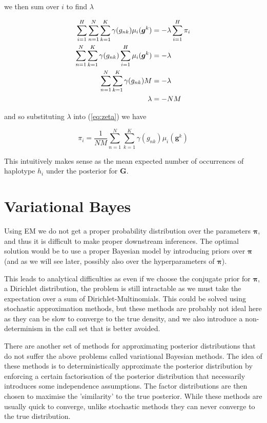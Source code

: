 \documentclass{article}
\begin{document}
we then sum over $i$ to find $\lambda$

\begin{align} 
    \sum_{i = 1}^H \sum_{n = 1}^N \sum_{k = 1}^K \gamma(g_{nk}) \mu_i(\boldsymbol{g}^k) &= -\lambda \sum_{i = 1}^H \pi_i \notag\\
      \sum_{n = 1}^N \sum_{k = 1}^K \gamma(g_{nk}) \sum_{i = 1}^H  \mu_i(\boldsymbol{g}^k) &= -\lambda \notag\\
      \sum_{n = 1}^N \sum_{k = 1}^K \gamma(g_{nk}) M &= -\lambda \notag\\
      \lambda &= -NM
\end{align}

and so substituting $\lambda$ into (\ref{eq:zeta}) we have

\begin{equation}
\label{eq:em_solution}
   \pi_i = \frac{1}{NM} \sum_{n = 1}^N \sum_{k = 1}^K \gamma(g_{nk}) \mu_i(\boldsymbol{g}^k)
\end{equation}

This intuitively makes sense as the mean expected number of occurrences of haplotype $h_i$ under the posterior for $\boldsymbol{G}$.

\section{Variational Bayes}

Using EM we do not get a proper probability distribution over the parameters $\boldsymbol{\pi}$, and thus it is difficult to make proper downstream inferences. The optimal solution would be to use a proper Bayesian model by introducing priors over $\boldsymbol{\pi}$ (and as we will see later, possibly also over the hyperparameters of $\boldsymbol{\pi}$).

This leads to analytical difficulties as even if we choose the conjugate prior for $\boldsymbol{\pi}$, a Dirichlet distribution, the problem is still intractable as we must take the expectation over a sum of Dirichlet-Multinomials. This could be solved using stochastic approximation methods, but these methods are probably not ideal here as they can be slow to converge to the true density, and we also introduce a non-determinism in the call set that is better avoided.

There are another set of methods for approximating posterior distributions that do not suffer the above problems called variational Bayesian methods. The idea of these methods is to deterministically approximate the posterior distribution by enforcing a certain factorisation of the posterior distribution that necessarily introduces some independence assumptions. The factor distributions are then chosen to maximise the 'similarity' to the true posterior. While these methods are usually quick to converge, unlike stochastic methods they can never converge to the true distribution.
\end{document}
